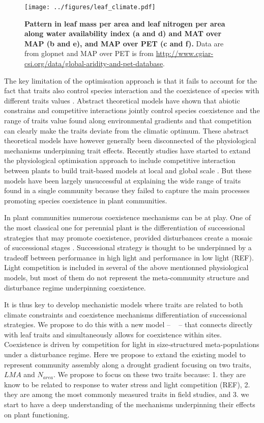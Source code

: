 \documentclass[a4paper,11pt]{article}
\begin{document}
\begin{figure}[ht]
\centering
\texttt{[image: ../figures/leaf\_climate.pdf]}
\caption{\textbf{Pattern in leaf mass per area and leaf nitrogen per area along water availability index (a and d) and MAT over MAP (b and e), and MAP over PET (c and f).} Data are from glopnet \citep{Wright-2004} and MAP over PET is from \url{http://www.cgiar-csi.org/data/global-aridity-and-pet-database}.
\label{fig:leafpattern}}
\end{figure}


The key limitation of the optimisation approach is that it fails to account for the fact that
traits also control species interaction and the coexistence of
species with different traits values \citep{Chesson-2018}. 
Abstract theoretical models \citep{Case-2000,Goldberg-2006,Leimar-2008} have shown that abiotic constrains and competitive interactions jointly control species coexistence and the range of traits
value found along environmental gradients and that competition can
clearly make the traits deviate from the climatic optimum. These
abstract theoretical models have however generally been disconnected
of the physiological mechanisms underpinning trait effects. Recently studies have started to extand the physiological optimisation
approach to include competitive interaction between plants to build trait-based models at local \citep{Farrior-2013} and global
scale \citep[see][]{Sakschewski-2015,Scheiter-2013}. But these models
have been largely unsuccessful at explaining the wide range of traits
found in a single community because they failed to capture the main
processes promoting species coexistence in plant communities.

In plant communities numerous coexistence mechanisms can be at
play. One of the most classical one for perennial plant is the
differentiation of successional strategies that may promote
coexistence, provided disturbances create a mosaic of successional
stages \citep{Falster-2017}. Successional strategy is thought to be underpinned by a tradeoff
between performance in high light and performance in low light (REF). Light
competition is included in several of the above mentionned
physiological models, but most of them do not represent the
meta-community structure and disturbance regime underpinning coexistence.

It is thus key to develop mechanistic models where traits are related
to both climate constraints and coexistence mechanisms differentiation of successional strategies. We propose to do this with a new model -- \plant\
\citep{Falster-2016,Falster-2017} -- that connects directly with leaf
traits and simultaneously allows for coexistence within sites. Coexistence is driven by competition for light
in size-structured meta-populations under a disturbance regime. Here
we propose to extand the existing model to represent community
assembly along a drought gradient focusing on two traits, $LMA$ and
$N_{area}$. We propose to focus on these two traits because: 1. they
 are know to be related to response to water stress and light
competition (REF), 2.  they are among the most commonly measured
traits in field studies, and 3. we start to have a deep understanding
of the mechanisms underpinning their effects on plant functioning. 
\end{document}
